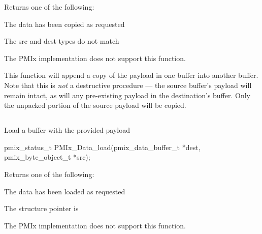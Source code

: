 \begin{arglist}
\end{arglist}

Returns one of the following:
\begin{constantdesc}
\item {} The data has been copied as requested
\item {} The src and dest  types do not match
\item {} The \ac{PMIx} implementation does not support this function.
\end{constantdesc}

\descr

This function will append a copy of the payload in one buffer into another buffer. Note that this is \textit{not} a destructive procedure --- the source buffer's payload will remain intact, as will any pre-existing payload in the destination's buffer. Only the unpacked portion of the source payload will be copied.


\subsection{}

\summary

Load a buffer with the provided payload

\format

\cspecificstart
\begin{codepar}
pmix_status_t
PMIx_Data_load(pmix_data_buffer_t *dest,
               pmix_byte_object_t *src);
\end{codepar}
\cspecificend

\begin{arglist}
\end{arglist}

Returns one of the following:
\begin{constantdesc}
\item {} The data has been loaded as requested
\item {} The  structure pointer is 
\item {} The \ac{PMIx} implementation does not support this function.
\end{constantdesc}

